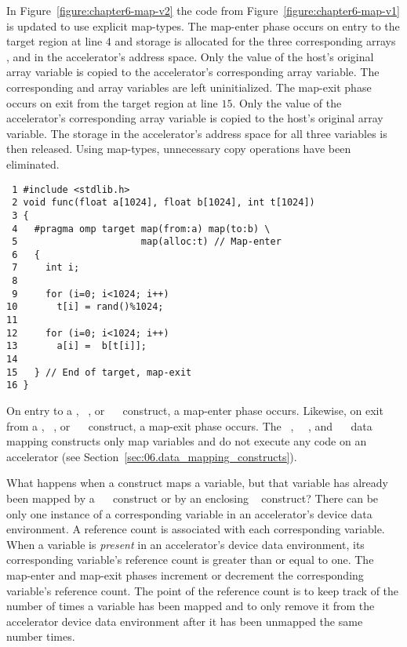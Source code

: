In Figure~\ref{figure:chapter6-map-v2} the code from
Figure~\ref{figure:chapter6-map-v1} is updated to use explicit map-types.  The
map-enter phase occurs on entry to the target region at line $4$ and
storage is allocated for the three corresponding arrays ,  and  in the
accelerator's address space.  Only the value of the host's original  array
variable is copied to the accelerator's corresponding  array variable. The
corresponding  and  array variables are left uninitialized.  The map-exit
phase occurs on exit from the target region at line $15$.  Only the
value of the accelerator's corresponding  array variable is copied to the
host's original  array variable.  The storage in the accelerator's address
space for all three variables is then released.  Using map-types, unnecessary
copy operations have been eliminated.

\begin{figure*}[!tb]
\begin{verbatim}
 1 #include <stdlib.h>
 2 void func(float a[1024], float b[1024], int t[1024])
 3 {
 4   #pragma omp target map(from:a) map(to:b) \
 5                      map(alloc:t) // Map-enter
 6   {
 7     int i;
 8 
 9     for (i=0; i<1024; i++)
10       t[i] = rand()%1024;
11 
12     for (i=0; i<1024; i++)
13       a[i] =  b[t[i]];
14 
15   } // End of target, map-exit
16 }
\end{verbatim}
\caption{ \textbf {Example of the map clause with map-types} -- \small
          Eliminate superfluous copies by using map-types.
         }
\label{figure:chapter6-map-v2}
\end{figure*}

On entry to a , ~, or
~~ construct, a map-enter phase occurs.
Likewise, on exit from a , \code{target}~, or
~\code{exit}~ construct, a map-exit phase occurs.
The ~, \code{target}~\code{enter}~\code{data}, and
\code{target}~\code{exit}~\code{data} data mapping constructs only map
variables and do not execute any code on an accelerator (see
Section~\ref{sec:06.data_mapping_constructs}).

What happens when a construct maps a variable, but that variable has already
been mapped by a ~\code{enter}~ construct or by an
enclosing \code{target}~\code{data} construct?  
There can be only one instance of a corresponding variable in an accelerator's
device data environment.  A reference count is associated with each
corresponding variable.  When a variable is \emph{present} in an accelerator's
device data environment, its corresponding variable's reference count is
greater than or equal to one.
The map-enter and map-exit phases increment or decrement the
corresponding variable's reference count.  The point of the reference count is
to keep track of the number of times a variable has been mapped and to only
remove it from the accelerator device data environment after it has been
unmapped the same number times.

